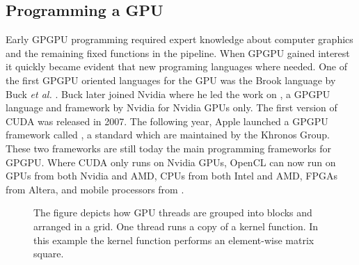 \subsection{Programming a GPU}
Early GPGPU programming required expert knowledge about computer graphics and the remaining fixed functions in the pipeline. When GPGPU gained interest it quickly became evident that new programing languages where needed.  One of the first GPGPU oriented languages for the GPU was the Brook language by Buck \textit{et al.} \cite{Buck2004}. Buck later joined Nvidia where he led the work on , a GPGPU language and framework by Nvidia for Nvidia GPUs only. The first version of CUDA was released in 2007. The following year, Apple launched a GPGPU framework called , a standard which are maintained by the Khronos Group. These two frameworks are still today the main programming frameworks for GPGPU. Where CUDA only runs on Nvidia GPUs, OpenCL can now run on GPUs from both Nvidia and AMD, CPUs from both Intel and AMD, FPGAs from Altera, and mobile processors from .

\begin{figure}
\centering
{}
\caption{The figure depicts how GPU threads are grouped into blocks and arranged in a grid. One thread runs a copy of a kernel function. In this example the kernel function performs an element-wise matrix square.}
\label{fig:gpu_grid_kernel}
\end{figure}

